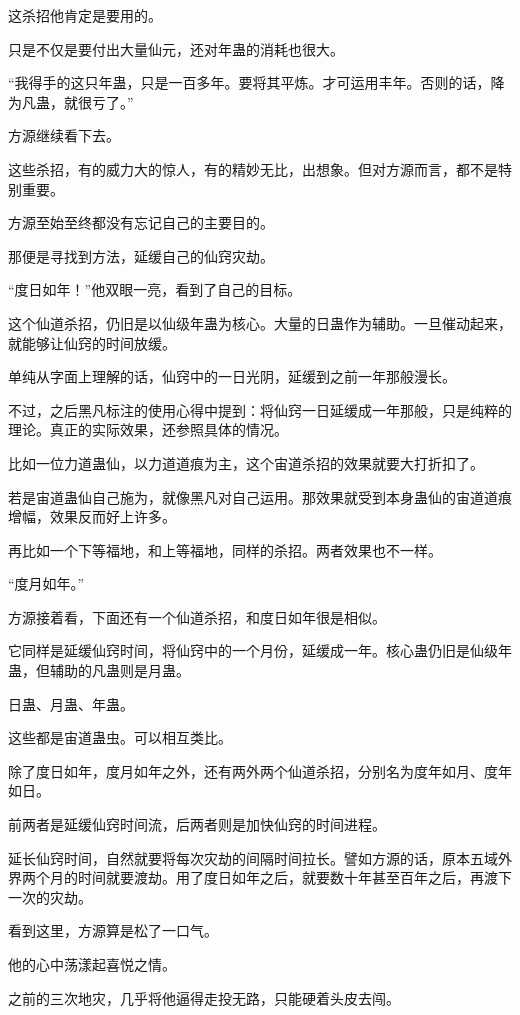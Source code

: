 \begin{this_body}
这杀招他肯定是要用的。

只是不仅是要付出大量仙元，还对年蛊的消耗也很大。

“我得手的这只年蛊，只是一百多年。要将其平炼。才可运用丰年。否则的话，降为凡蛊，就很亏了。”

方源继续看下去。

这些杀招，有的威力大的惊人，有的精妙无比，出想象。但对方源而言，都不是特别重要。

方源至始至终都没有忘记自己的主要目的。

那便是寻找到方法，延缓自己的仙窍灾劫。

“度日如年！”他双眼一亮，看到了自己的目标。

这个仙道杀招，仍旧是以仙级年蛊为核心。大量的日蛊作为辅助。一旦催动起来，就能够让仙窍的时间放缓。

单纯从字面上理解的话，仙窍中的一日光阴，延缓到之前一年那般漫长。

不过，之后黑凡标注的使用心得中提到：将仙窍一日延缓成一年那般，只是纯粹的理论。真正的实际效果，还参照具体的情况。

比如一位力道蛊仙，以力道道痕为主，这个宙道杀招的效果就要大打折扣了。

若是宙道蛊仙自己施为，就像黑凡对自己运用。那效果就受到本身蛊仙的宙道道痕增幅，效果反而好上许多。

再比如一个下等福地，和上等福地，同样的杀招。两者效果也不一样。

“度月如年。”

方源接着看，下面还有一个仙道杀招，和度日如年很是相似。

它同样是延缓仙窍时间，将仙窍中的一个月份，延缓成一年。核心蛊仍旧是仙级年蛊，但辅助的凡蛊则是月蛊。

日蛊、月蛊、年蛊。

这些都是宙道蛊虫。可以相互类比。

除了度日如年，度月如年之外，还有两外两个仙道杀招，分别名为度年如月、度年如日。

前两者是延缓仙窍时间流，后两者则是加快仙窍的时间进程。

延长仙窍时间，自然就要将每次灾劫的间隔时间拉长。譬如方源的话，原本五域外界两个月的时间就要渡劫。用了度日如年之后，就要数十年甚至百年之后，再渡下一次的灾劫。

看到这里，方源算是松了一口气。

他的心中荡漾起喜悦之情。

之前的三次地灾，几乎将他逼得走投无路，只能硬着头皮去闯。


\end{this_body}
